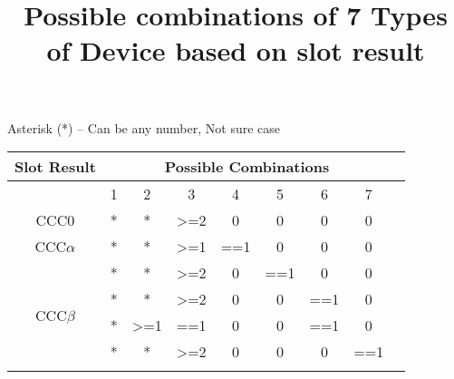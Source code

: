 \documentclass[fleqn]{article}
\begin{document}
\title{Possible combinations of 7 Types of Device based on slot result}

\maketitle{}

Asterisk (*) – Can be any number, Not sure case 

\begin {table} [h]
\centering
\begin{tabular}{|c|c|c|c|c|c|c|c|c|}
\hline
Slot Result                  & \multicolumn{7}{c|}{Possible Combinations}                                                                                                                                       \\ \hline
                             & 1                              & 2                              & 3                & 4   & 5                                & 6                               & 7                \\ \hline
CCC0                         & *                              & *                              & \textgreater{}=2 & 0   & 0                                & 0                               & 0                \\ \hline
CCC$\alpha$                         & *                              & *                              & \textgreater{}=1 & ==1 & 0                                & 0                               & 0                \\ \hline
\multirow{5}{*}{CCC$\beta$}  & *                              & *                              & \textgreater{}=2 & 0   & ==1                              & 0                               & 0                \\ \cline{2-8} 
                             & *                              & *                              & \textgreater{}=2 & 0   & 0                                & ==1                             & 0                \\ \cline{2-8} 
                             & *                              & \textgreater{}=1               & ==1              & 0   & 0                                & ==1                             & 0                \\ \cline{2-8} 
                             & *                              & *                              & \textgreater{}=2 & 0   & 0                                & 0                               & ==1              \\ \cline{2-8} 

\end{tabular}
\end{table}
\end{document}
